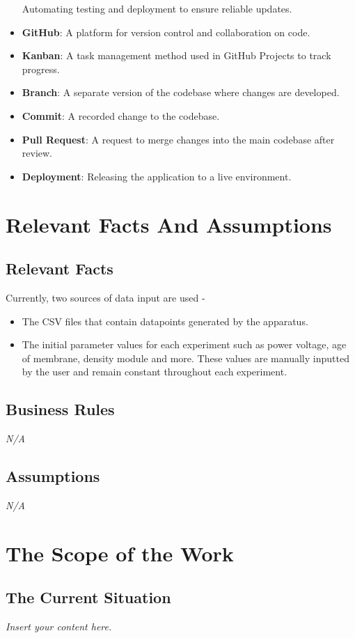 \documentclass[12pt]{article}
\newcommand{\lips}{\textit{Insert your content here.}}
\begin{document}
\begin{itemize}
    Automating testing and deployment to ensure reliable updates.
    \item \textbf{GitHub}: A platform for version control and collaboration on
    code.
    \item \textbf{Kanban}: A task management method used in GitHub Projects to
    track progress.
    \item \textbf{Branch}: A separate version of the codebase where changes are
    developed.
    \item \textbf{Commit}: A recorded change to the codebase.
    \item \textbf{Pull Request}: A request to merge changes into the main
    codebase after review.
    \item \textbf{Deployment}: Releasing the application to a live environment.
\end{itemize}

\section{Relevant Facts And Assumptions}
\subsection{Relevant Facts}
Currently, two sources of data input are used -
\begin{itemize}
  \item The CSV files that contain datapoints generated by the apparatus.
  \item The initial parameter values for each experiment such as power voltage, age of membrane, density module and more. These values are manually inputted by the user 
  and remain constant throughout each experiment.
\end{itemize}

\subsection{Business Rules}
\emph{N/A}
\subsection{Assumptions}
\emph{N/A}

\section{The Scope of the Work}
\subsection{The Current Situation}
\lips
\end{document}
